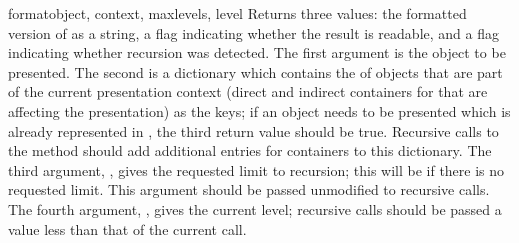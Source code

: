 \begin{methoddesc}{format}{object, context, maxlevels, level}
Returns three values: the formatted version of  as a
string, a flag indicating whether the result is readable, and a flag
indicating whether recursion was detected.  The first argument is the
object to be presented.  The second is a dictionary which contains the
 of objects that are part of the current presentation
context (direct and indirect containers for  that are
affecting the presentation) as the keys; if an object needs to be
presented which is already represented in , the third
return value should be true.  Recursive calls to the 
method should add additional entries for containers to this
dictionary.  The third argument, , gives the requested
limit to recursion; this will be  if there is no requested
limit.  This argument should be passed unmodified to recursive calls.
The fourth argument, , gives the current level; recursive
calls should be passed a value less than that of the current call.
\end{methoddesc}

